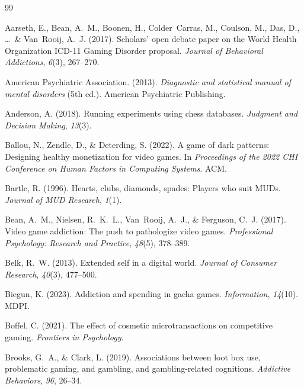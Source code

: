 \documentclass[12pt]{article}
\begin{document}
\begin{thebibliography}{99}

Aarseth, E., Bean, A.~M., Boonen, H., Colder~Carras, M., Coulson, M., Das, D., \ldots\ \& Van~Rooij, A.~J. (2017).
\newblock Scholars' open debate paper on the World Health Organization ICD-11 Gaming Disorder proposal.
\newblock \textit{Journal of Behavioral Addictions}, \textit{6}(3), 267--270.

American Psychiatric Association. (2013).
\newblock \textit{Diagnostic and statistical manual of mental disorders} (5th ed.).
\newblock American Psychiatric Publishing.

Anderson, A. (2018).
\newblock Running experiments using chess databases.
\newblock \textit{Judgment and Decision Making}, \textit{13}(3).

Ballou, N., Zendle, D., \& Deterding, S. (2022).
\newblock A game of dark patterns: Designing healthy monetization for video games.
\newblock In \textit{Proceedings of the 2022 CHI Conference on Human Factors in Computing Systems}. ACM.

Bartle, R. (1996).
\newblock Hearts, clubs, diamonds, spades: Players who suit MUDs.
\newblock \textit{Journal of MUD Research}, \textit{1}(1).

Bean, A.~M., Nielsen, R.~K.~L., Van~Rooij, A.~J., \& Ferguson, C.~J. (2017).
\newblock Video game addiction: The push to pathologize video games.
\newblock \textit{Professional Psychology: Research and Practice}, \textit{48}(5), 378--389.

Belk, R.~W. (2013).
\newblock Extended self in a digital world.
\newblock \textit{Journal of Consumer Research}, \textit{40}(3), 477--500.

Biegun, K. (2023).
\newblock Addiction and spending in gacha games.
\newblock \textit{Information}, \textit{14}(10). MDPI.

Boffel, C. (2021).
\newblock The effect of cosmetic microtransactions on competitive gaming.
\newblock \textit{Frontiers in Psychology}.

Brooks, G.~A., \& Clark, L. (2019).
\newblock Associations between loot box use, problematic gaming, and gambling, and gambling-related cognitions.
\newblock \textit{Addictive Behaviors}, \textit{96}, 26--34.


\end{thebibliography}
\end{document}
